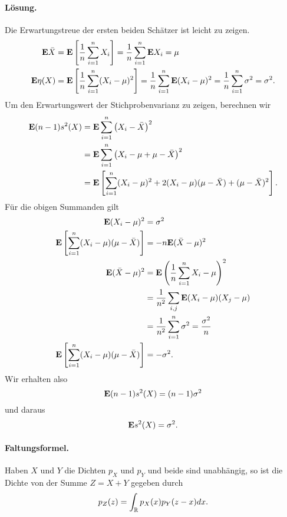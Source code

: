 \paragraph*{Lösung.}
Die Erwartungstreue der ersten beiden Schätzer ist leicht zu zeigen. 
\begin{align*}
    \mathbf{E} \bar X &= \mathbf{E} \left[ \frac{1}{n} \sum_{i=1}^{n} X_i \right] 
    = \frac{1}{n} \sum_{i=1}^{n} \mathbf{E} X_i = \mu \\
    \mathbf{E} \eta(X) &= \mathbf{E} \left[ \frac{1}{n} \sum_{i=1}^{n} (X_i -\mu)^2 \right] 
    = \frac{1}{n} \sum_{i=1}^{n} \mathbf{E} (X_i-\mu)^2 = \frac{1}{n} \sum_{i=1}^{n} \sigma^2 = \sigma^2.
\end{align*}
Um den Erwartungswert der Stichprobenvarianz zu zeigen, berechnen wir
\begin{align*}
    \mathbf{E} (n-1) s^2(X) &= \mathbf{E} \sum_{i=1}^{n} \left( X_i - \bar X \right)^2 \\
    &= \mathbf{E} \sum_{i=1}^{n} \left( X_i - \mu + \mu - \bar X \right)^2 \\
    &= \mathbf{E} \left[ \sum_{i=1}^{n} (X_i-\mu)^2 + 2 (X_i-\mu)(\mu-\bar X) + (\mu -\bar X)^2 \right].
\end{align*}
Für die obigen Summanden gilt
\begin{align*}
    \mathbf{E} (X_i-\mu)^2 &= \sigma^2 \\
    \mathbf{E} \left[ \sum_{i=1}^{n} (X_i-\mu)(\mu-\bar X) \right] &= -n \mathbf{E} (\bar X-\mu)^2 \\ 
    \mathbf{E} (\bar X-\mu)^2 &= \mathbf{E} \left( \frac{1}{n} \sum_{i=1}^{n} X_i-\mu \right)^2 \\
    &= \frac{1}{n^2} \sum_{i,j}^{} \mathbf{E} (X_i-\mu)(X_j-\mu) \\
    &= \frac{1}{n^2} \sum_{i=1}^{n} \sigma^2 = \frac{\sigma^2}{n} \\
    \mathbf{E} \left[ \sum_{i=1}^{n} (X_i-\mu)(\mu-\bar X) \right] &= -\sigma^2.
\end{align*}
Wir erhalten also 
\begin{equation*}
    \mathbf{E} (n-1) s^2(X) = (n-1) \sigma^2
\end{equation*}
und daraus
\begin{equation*}
    \mathbf{E} s^2(X) = \sigma^2. 
\end{equation*}



\paragraph{Faltungsformel. } Haben $X$ und $Y$ die Dichten $p_X$ und $p_Y$ und beide
sind unabhängig, so ist die Dichte von der Summe $Z=X+Y$ gegeben durch
\begin{equation*}
    p_Z(z) = \int_{\mathbb R}^{} p_X(x)p_Y(z-x) dx.
\end{equation*}%


